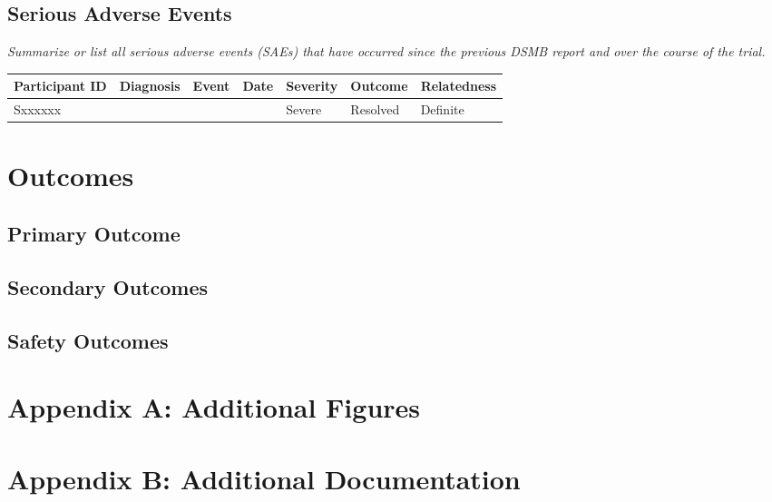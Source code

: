 \documentclass[
  11pt,
]{article}
\begin{document}
\hypertarget{serious-adverse-events}{%
\subsection{Serious Adverse Events}\label{serious-adverse-events}}

\emph{Summarize or list all serious adverse events (SAEs) that have occurred since the previous DSMB report and over the course of the trial.}

\begin{longtable}[]{@{}lllllll@{}}
\toprule
Participant ID & Diagnosis & Event & Date & Severity & Outcome & Relatedness\tabularnewline
\midrule
\endhead
Sxxxxxx & & & & Severe & Resolved & Definite\tabularnewline
\bottomrule
\end{longtable}

\clearpage

\hypertarget{outcomes}{%
\section{Outcomes}\label{outcomes}}

\hypertarget{primary-outcome}{%
\subsection{Primary Outcome}\label{primary-outcome}}

\hypertarget{secondary-outcomes}{%
\subsection{Secondary Outcomes}\label{secondary-outcomes}}

\hypertarget{safety-outcomes}{%
\subsection{Safety Outcomes}\label{safety-outcomes}}

\clearpage

\hypertarget{appendix-a-additional-figures}{%
\section*{Appendix A: Additional Figures}\label{appendix-a-additional-figures}}

\clearpage

\hypertarget{appendix-b-additional-documentation}{%
\section*{Appendix B: Additional Documentation}\label{appendix-b-additional-documentation}}
\end{document}
